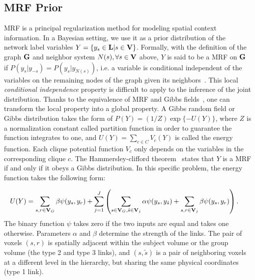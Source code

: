 \documentclass[review,authoryear]{elsarticle}
\begin{document}
\subsection{MRF Prior}
\label{sec:mrfprior}
MRF is a principal regularization method for modeling spatial context
information. In a Bayesian setting, we use it as a prior distribution of the
network label variables $Y = \{y_s \in \text{\bf L}| s\in \text{\bf V} \}$. Formally, with
the definition of the graph $\text{\bf G}$ and neighbor system $N(s), \forall s \in
\text{\bf V}$ above, $Y$ is said to be a MRF on $\text{\bf G}$ if $P(y_s | y_{-s}) = P(y_s |
y_{N(s)})$, i.e. a variable is conditional independent of the variables on the
remaining nodes of the graph given its neighbors~\citep{li1995markov}. This
local \emph{conditional independence} property is difficult to apply to the
inference of the joint distribution. Thanks to the equivalence of MRF and Gibbs
fields~\citep{besag_spatial_1974}, one can transform the local property into a
global property. A Gibbs random field or Gibbs distribution takes the form of
$P(Y) = (1/Z) \exp\{ -U(Y)\}$, where $Z$ is a normalization constant called
partition function in order to guarantee the function integrates to one, and
$U(Y) = \sum_{c\in C} V_c(Y)$ is called the energy function. Each clique
potential function $V_c$ only depends on the variables in the corresponding
clique $c$. The Hammersley-clifford theorem~\citep{hammersley1968markov} states
that $Y$ is a MRF if and only if it obeys a Gibbs distribution. In this
specific problem, the energy function takes the following form:

\begin{align}
  U(Y) &= \sum_{s,r\in\text{\bf V}_G} \beta \psi(y_s, y_r) + \sum_{j=1}^J \left ( \sum_{s\in\text{\bf V}_G, \tilde s\in\text{\bf V}_j} \alpha \psi(y_s, y_{\tilde s}) + \sum_{s,r\in\text{\bf V}_j}\beta\psi(y_s, y_r) \right ).\label{eq:energy}
\end{align}
The binary function $\psi$ takes zero if the two inputs are equal and takes one
otherwise. Parameters $\alpha$ and $\beta$ determine the strength of the
links. The pair of voxels $(s, r)$ is spatially adjacent within the subject
volume or the group volume (the type 2 and type 3 links), and $(s, \tilde s)$ is
a pair of neighboring voxels at a different level in the hierarchy, but sharing
the same physical coordinates (type 1 link).
\end{document}
